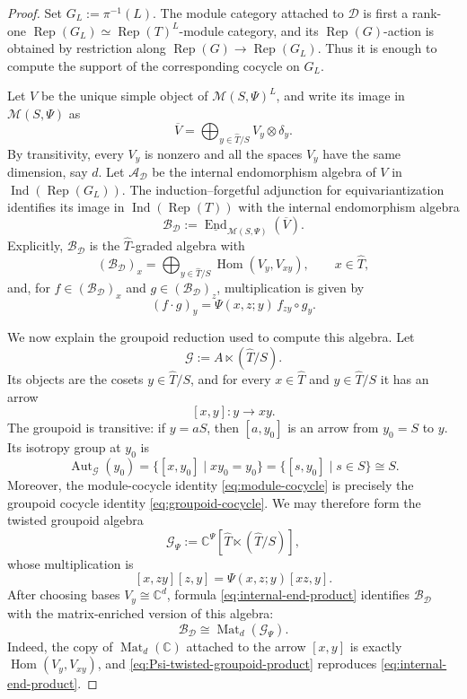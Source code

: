 \documentclass{amsart}
\theoremstyle{definition}
\newcommand{\End}{\operatorname{End}}
\newcommand{\Hom}{\operatorname{Hom}}
\newcommand{\Rep}{\operatorname{Rep}}
\newcommand{\M}{\mathscr{M}}
\numberwithin{equation}{section}
\begin{document}
\begin{proof}
Set $G_L:=\pi^{-1}(L)$.  The module category attached to $\mathcal D$ is first a
rank-one $\Rep(G_L)\simeq\Rep(T)^L$-module category, and its $\Rep(G)$-action is
obtained by restriction along $\Rep(G)\to\Rep(G_L)$.  Thus it is enough to compute
the support of the corresponding cocycle on $G_L$.

Let $V$ be the unique simple object of $\M(S,\Psi)^L$, and write its image in
$\M(S,\Psi)$ as
\[
 \overline V=\bigoplus_{y\in \widehat{T}/S}V_y\otimes\delta_y.
\]
By transitivity, every $V_y$ is nonzero and all the spaces $V_y$ have the same
dimension, say $d$.  Let $\mathcal A_{\mathcal D}$ be the internal endomorphism
algebra of $V$ in $\operatorname{Ind}(\Rep(G_L))$.  The induction--forgetful
adjunction for equivariantization identifies its image in
$\operatorname{Ind}(\Rep(T))$ with the internal endomorphism algebra
\[
 \mathcal B_{\mathcal D}
 :=\underline{\End}_{\M(S,\Psi)}(\overline V).
\]
Explicitly, $\mathcal B_{\mathcal D}$ is the $\widehat{T}$-graded algebra with
\[
 (\mathcal B_{\mathcal D})_x
 =\bigoplus_{y\in \widehat{T}/S}\Hom(V_y,V_{xy}),
 \qquad x\in \widehat{T},
\]
and, for $f\in(\mathcal B_{\mathcal D})_x$ and
$g\in(\mathcal B_{\mathcal D})_z$, multiplication is given by
\begin{equation}\label{eq:internal-end-product}
 (f\cdot g)_y
 =\Psi(x,z;y)\,f_{zy}\circ g_y.
\end{equation}

We now explain the groupoid reduction used to compute this algebra.  Let
\[
 \mathcal G:=A\ltimes (\widehat{T}/S).
\]
Its objects are the cosets $y\in \widehat{T}/S$, and for every $x\in \widehat{T}$ and $y\in \widehat{T}/S$ it
has an arrow
\[
 [x,y]:y\longrightarrow xy.
\]
The groupoid is transitive: if $y=aS$, then $[a,y_0]$ is an arrow from
$y_0=S$ to $y$.  Its isotropy group at $y_0$ is
\[
 \operatorname{Aut}_{\mathcal G}(y_0)
 =\{[x,y_0]\mid xy_0=y_0\}
 =\{[s,y_0]\mid s\in S\}\cong S.
\]
Moreover, the module-cocycle identity \eqref{eq:module-cocycle} is precisely the
groupoid cocycle identity \eqref{eq:groupoid-cocycle}.  We may therefore form the
twisted groupoid algebra
\[
 \mathcal G_{\Psi}:=\mathbb C^{\Psi}[\widehat{T}\ltimes (\widehat{T}/S)],
\]
whose multiplication is
\begin{equation}\label{eq:Psi-twisted-groupoid-product}
 [x,zy][z,y]=\Psi(x,z;y)[xz,y].
\end{equation}
After choosing bases $V_y\cong\mathbb C^d$, formula
\eqref{eq:internal-end-product} identifies $\mathcal B_{\mathcal D}$ with the
matrix-enriched version of this algebra:
\begin{equation}\label{eq:internal-end-as-groupoid-algebra}
 \mathcal B_{\mathcal D}
 \cong
 \operatorname{Mat}_d(\mathcal G_{\Psi}).
\end{equation}
Indeed, the copy of $\operatorname{Mat}_d(\mathbb C)$ attached to the arrow
$[x,y]$ is exactly $\Hom(V_y,V_{xy})$, and
\eqref{eq:Psi-twisted-groupoid-product} reproduces
\eqref{eq:internal-end-product}.


\end{proof}
\end{document}
